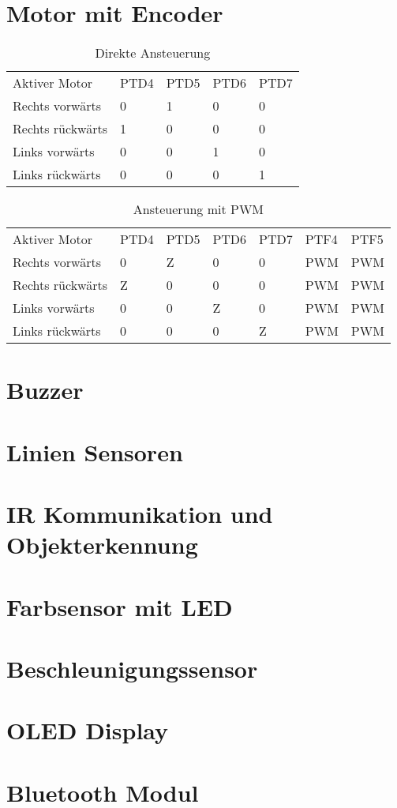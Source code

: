 \documentclass[a4paper,10pt,fleqn]{article}
\begin{document}
\section{Motor mit Encoder}
\begin{table}[h!]
\begin{tabular}{lllll}
\rowcolor{white} Aktiver Motor      & PTD4  & PTD5  & PTD6  & PTD7  \\
\rowcolor{lgray} Rechts vorwärts    & 0     & 1     & 0     & 0     \\
\rowcolor{white} Rechts rückwärts   & 1     & 0     & 0     & 0     \\
\rowcolor{lgray} Links vorwärts     & 0     & 0     & 1     & 0     \\
\rowcolor{white} Links rückwärts    & 0     & 0     & 0     & 1     \\
\end{tabular}
\caption{Direkte Ansteuerung}
\end{table}
\begin{table}[h!]
\begin{tabular}{lllllll}
\rowcolor{white} Aktiver Motor      & PTD4  & PTD5  & PTD6  & PTD7  & PTF4  & PTF5  \\
\rowcolor{lgray} Rechts vorwärts    & 0     & Z     & 0     & 0     & PWM   & PWM   \\
\rowcolor{white} Rechts rückwärts   & Z     & 0     & 0     & 0     & PWM   & PWM   \\
\rowcolor{lgray} Links vorwärts     & 0     & 0     & Z     & 0     & PWM   & PWM   \\
\rowcolor{white} Links rückwärts    & 0     & 0     & 0     & Z     & PWM   & PWM   \\
\end{tabular}
\caption{Ansteuerung mit PWM}
\end{table}



\section{Buzzer}

\section{Linien Sensoren}

\section{IR Kommunikation und Objekterkennung}

\section{Farbsensor mit LED}

\section{Beschleunigungssensor}

\section{OLED Display}

\section{Bluetooth Modul}
\end{document}
